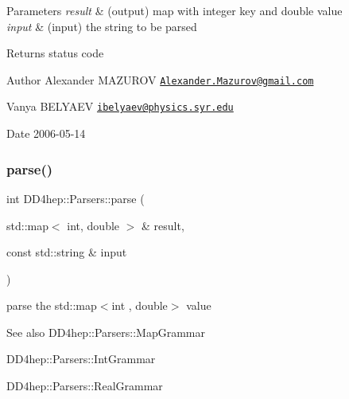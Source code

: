 \begin{DoxyParams}{Parameters}
{\em result} & (output) map with integer key and double value \\
\hline
{\em input} & (input) the string to be parsed \\
\hline
\end{DoxyParams}
\begin{DoxyReturn}{Returns}
status code
\end{DoxyReturn}
\begin{DoxyAuthor}{Author}
Alexander M\+A\+Z\+U\+R\+OV \href{mailto:Alexander.Mazurov@gmail.com}{\tt Alexander.\+Mazurov@gmail.\+com} 

Vanya B\+E\+L\+Y\+A\+EV \href{mailto:ibelyaev@physics.syr.edu}{\tt ibelyaev@physics.\+syr.\+edu} 
\end{DoxyAuthor}
\begin{DoxyDate}{Date}
2006-\/05-\/14 
\end{DoxyDate}
\hypertarget{namespace_d_d4hep_1_1_parsers_a948c73c7e48e93c657c717952295ce22}{}\label{namespace_d_d4hep_1_1_parsers_a948c73c7e48e93c657c717952295ce22} 
\subsubsection{\texorpdfstring{parse()}{parse()}\hspace{0.1cm}{\footnotesize\ttfamily [7/21]}}
{\footnotesize\ttfamily int D\+D4hep\+::\+Parsers\+::parse (\begin{DoxyParamCaption}\item[{std\+::map$<$ int, double $>$ \&}]{result,  }\item[{const std\+::string \&}]{input }\end{DoxyParamCaption})}



parse the {\ttfamily std\+::map$<$int , double$>$} value 

\begin{DoxySeeAlso}{See also}
D\+D4hep\+::\+Parsers\+::\+Map\+Grammar 

D\+D4hep\+::\+Parsers\+::\+Int\+Grammar 

D\+D4hep\+::\+Parsers\+::\+Real\+Grammar 
\end{DoxySeeAlso}

